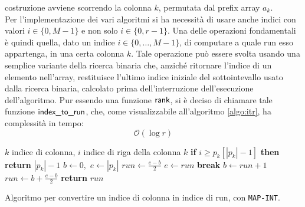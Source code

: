 costruzione 
avviene scorrendo la colonna $k$, permutata dal 
prefix array $a_k$.\\
Per
l'implementazione dei vari algoritmi si ha necessità di usare anche indici
con valori $i\in\{0, M-1\}$ e non solo $i\in\{0,r-1\}$. Una delle operazioni
fondamentali è quindi 
quella, dato un indice $i\in\{0,\ldots,M-1\}$, di computare a quale run esso
appartenga, in una certa colonna $k$. Tale operazione può essere svolta usando
una semplice variante della ricerca binaria che, anziché
ritornare l'indice di un elemento nell'array, restituisce
l'ultimo indice iniziale del sottointevallo usato dalla ricerca binaria,
calcolato prima dell'interruzione dell'esecuzione dell'algoritmo. Pur essendo
una funzione $\mbox{\rm {\sf rank}}$, 
si è deciso di chiamare tale funzione
$\mbox{\rm {\sf index\_to\_run}}$, che, come visualizzabile 
all'algoritmo \ref{algo:itr}, ha complessità in tempo:
\begin{equation}
  \label{eq:itrcomp}
  \mathcal{O}(\log r)
\end{equation}
\begin{algorithm}
  \footnotesize
  \begin{algorithmic}[1]
    \Comment $k$ indice di colonna, $i$ indice di riga della colonna $k$
    \State \textbf{if} $i\geq p_k[|p_k|-1]$ \textbf{then} \textbf{return}
    $|p_k|-1$ 
    \State $b\gets 0,\,\, e \gets |p_k|$
    \State $run\gets \frac{e-b}{2}$
    \State $e\gets run$
    \Else
    \State \textbf{break}
    \EndIf
    \State $b\gets run+1$
    \EndIf
    \State $run\gets b+\frac{e-b}{2}$
    \EndWhile
    \State \textbf{return} $run$
    \EndFunction
  \end{algorithmic}
  \caption{Algoritmo per convertire un indice di colonna in indice di run, con
    \texttt{MAP-INT}.} 
  \label{algo:itr}
\end{algorithm}

